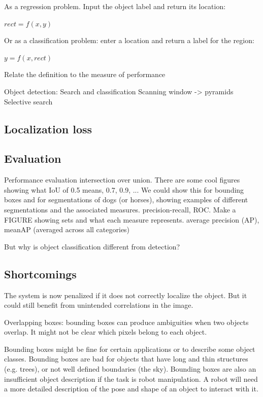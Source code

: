 As a regression problem. Input the object label and return its location:

$rect = f(x, y)$

Or as a classification problem: enter a location and return a label for the region:

$y = f(x, rect)$

Relate the definition to the measure of performance

Object detection: Search and classification
Scanning window -> pyramids
Selective search

\subsection{Localization loss}

\subsection{Evaluation}

Performance evaluation
intersection over union. There are some  cool figures showing what IoU of 0.5 means, 0.7, 0.9, ... We could show this for bounding boxes and for segmentations  of dogs (or horses), showing examples of different segmentations and the associated measures.
precision-recall, ROC. Make a FIGURE  showing sets and what  each  measure represents.
average  precision  (AP), meanAP   (averaged across all categories)

But why is object classification different from detection?

\subsection{Shortcomings}



The system is now penalized if it does not correctly localize the object. But it could still benefit from unintended correlations in the image.

Overlapping boxes: bounding boxes can produce ambiguities when two objects overlap. It might not be clear which pixels belong to each object.

Bounding boxes might be fine for certain applications or to describe some object classes. Bounding boxes are bad for objects that have long and thin structures (e.g. trees), or not well defined boundaries (the sky). Bounding boxes are also an insufficient object description if the task is robot manipulation. A robot will need a more detailed description of the pose and shape of an object to interact with it.


